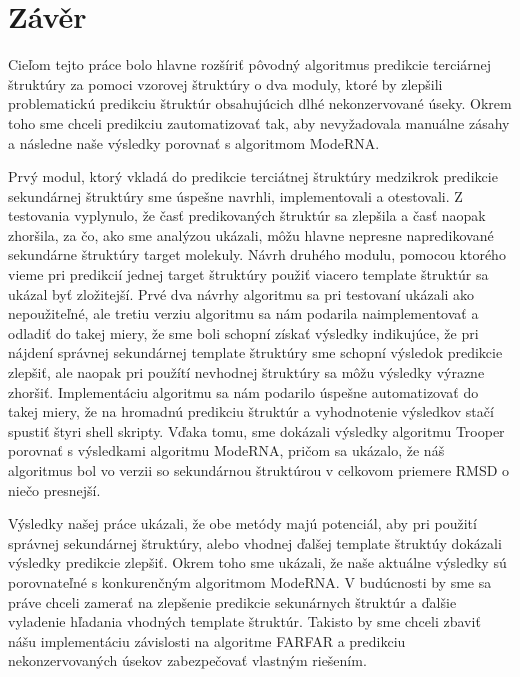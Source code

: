 \chapter*{Závěr}
Cieľom tejto práce bolo hlavne rozšíriť pôvodný algoritmus predikcie terciárnej štruktúry za pomoci vzorovej štruktúry o dva moduly, ktoré by zlepšili problematickú predikciu štruktúr obsahujúcich dlhé nekonzervované úseky. Okrem toho sme chceli predikciu zautomatizovať tak, aby nevyžadovala manuálne zásahy a následne naše výsledky porovnať s algoritmom ModeRNA.

\indent Prvý modul, ktorý vkladá do predikcie terciátnej štruktúry medzikrok predikcie sekundárnej štruktúry sme úspešne navrhli, implementovali a otestovali. Z testovania vyplynulo, že časť predikovaných štruktúr sa zlepšila a časť naopak zhoršila, za čo, ako sme analýzou ukázali, môžu hlavne nepresne napredikované sekundárne štruktúry target molekuly.
Návrh druhého modulu, pomocou ktorého vieme pri predikcií jednej target štruktúry použiť  viacero template štruktúr sa ukázal byť zložitejší. Prvé dva návrhy algoritmu sa pri testovaní ukázali ako nepoužiteľné, ale tretiu verziu algoritmu sa nám podarila naimplementovať a odladiť do takej miery, že sme boli schopní získať výsledky indikujúce, že pri nájdení správnej sekundárnej template štruktúry sme schopní výsledok predikcie zlepšiť, ale naopak pri použítí nevhodnej štruktúry sa môžu výsledky výrazne zhoršiť.
Implementáciu algoritmu sa nám podarilo úspešne automatizovať do takej miery, že na hromadnú predikciu štruktúr a vyhodnotenie výsledkov stačí spustiť štyri shell skripty. Vďaka tomu, sme dokázali výsledky algoritmu Trooper porovnať s výsledkami algoritmu ModeRNA, pričom sa ukázalo, že náš algoritmus bol vo verzii so sekundárnou štruktúrou v celkovom priemere RMSD o niečo presnejší.  

  
\indent Výsledky našej práce ukázali, že obe metódy majú potenciál, aby pri použití správnej sekundárnej štruktúry, alebo vhodnej  ďalšej template štruktúy dokázali  výsledky predikcie zlepšiť. Okrem toho sme ukázali, že naše aktuálne výsledky sú porovnateľné s konkurenčným algoritmom ModeRNA.
V budúcnosti by sme sa práve chceli zamerať na zlepšenie predikcie sekunárnych štruktúr a ďalšie vyladenie hľadania vhodných template štruktúr. Takisto by sme chceli zbaviť nášu implementáciu závislosti na algoritme FARFAR a predikciu nekonzervovaných úsekov zabezpečovať vlastným riešením.